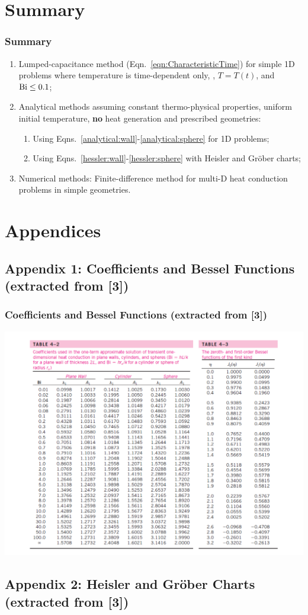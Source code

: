 \documentclass[10pt,compress,unknownkeysallowed]{beamer}
\begin{document}
\section{Summary} 


\begin{frame}
  \frametitle{Summary}
    \begin{enumerate}  
       \item Lumped-capacitance method (Eqn.~\ref{eqn:CharacteristicTime}) for simple 1D problems where temperature is time-dependent only, \ie , $T=T(t)$, and $\mathrm{Bi} \leq 0.1$;  
       \item Analytical methods assuming constant thermo-physical properties, uniform initial temperature, {\bf no} heat generation and prescribed geometries:
           \begin{enumerate}
              \item Using Eqns.~\ref{analytical:wall}-\ref{analytical:sphere} for 1D problems;
              \item Using Eqns.~\ref{hessler:wall}-\ref{hessler:sphere} with Heisler and Gr\"ober charts;
            \end{enumerate}
       \item Numerical methods: Finite-difference method for multi-D heat conduction problems in simple geometries.
    \end{enumerate}
\end{frame}


\section{Appendices}

\subsection{Appendix 1: Coefficients and Bessel Functions (extracted from [3])}\label{appendix1}
\begin{frame}
 \frametitle{Coefficients and Bessel Functions (extracted from [3])}
        \begin{center}
          \includegraphics[width=.9\columnwidth,height=.65\columnwidth,clip]{./Pics/BaselFunctionTable}
        \end{center}
\end{frame}


\subsection{Appendix 2: Heisler and Gr\"ober Charts (extracted from [3])}\label{appendix2}
{
  
}
\end{document}
